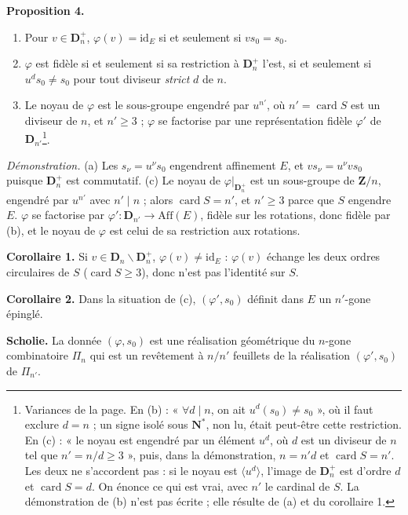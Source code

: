 \documentclass[11pt,a4paper]{article}
\begin{document}
\textbf{Proposition 4.}
\begin{enumerate}
  \item[(a)] Pour $v \in \mathbf{D}_n^{+}$, $\varphi(v) = \mathrm{id}_E$ si et
    seulement si $v s_0 = s_0$.
  \item[(b)] $\varphi$ est fidèle si et seulement si sa restriction à
    $\mathbf{D}_n^{+}$ l'est, si et seulement si $u^d s_0 \neq s_0$ pour tout
    diviseur \emph{strict} $d$ de $n$.
  \item[(c)] Le noyau de $\varphi$ est le sous-groupe engendré par
    $u^{n'}$, où $n' = \operatorname{card} S$ est un diviseur de $n$, et
    $n' \geq 3$ ; $\varphi$ se factorise par une représentation fidèle
    $\varphi'$ de $\mathbf{D}_{n'}$\footnote{Variances de la page. En (b) :
    « $\forall d \mid n$, on ait $u^d(s_0) \neq s_0$ », où il faut exclure
    $d = n$ ; un signe isolé sous $\mathbf{N}^{*}$, non lu, était peut-être
    cette restriction. En (c) : « le noyau est engendré par un élément $u^d$,
    où $d$ est un diviseur de $n$ tel que $n' = n/d \geq 3$ », puis, dans la
    démonstration, $n = n'd$ et $\operatorname{card} S = n'$. Les deux ne
    s'accordent pas : si le noyau est $\langle u^d \rangle$, l'image de
    $\mathbf{D}_n^{+}$ est d'ordre $d$ et $\operatorname{card} S = d$. On
    énonce ce qui est vrai, avec $n'$ le cardinal de $S$. La démonstration
    de (b) n'est pas écrite ; elle résulte de (a) et du corollaire 1.}.
\end{enumerate}
\emph{Démonstration.} (a) Les $s_\nu = u^\nu s_0$ engendrent affinement $E$, et
$v s_\nu = u^\nu v s_0$ puisque $\mathbf{D}_n^{+}$ est commutatif. (c) Le noyau
de $\varphi|_{\mathbf{D}_n^{+}}$ est un sous-groupe de $\mathbf{Z}/n$, engendré
par $u^{n'}$ avec $n' \mid n$ ; alors $\operatorname{card} S = n'$, et $n'
\geq 3$ parce que $S$ engendre $E$. $\varphi$ se factorise par $\varphi' :
\mathbf{D}_{n'} \to \mathrm{Aff}(E)$, fidèle sur les rotations, donc fidèle
par (b), et le noyau de $\varphi$ est celui de sa restriction aux rotations.

\textbf{Corollaire 1.} Si $v \in \mathbf{D}_n \smallsetminus
\mathbf{D}_n^{+}$, $\varphi(v) \neq \mathrm{id}_E$ : $\varphi(v)$ échange les
deux ordres circulaires de $S$ ($\operatorname{card} S \geq 3$), donc n'est
pas l'identité sur $S$.

\textbf{Corollaire 2.} Dans la situation de (c), $(\varphi', s_0)$ définit
dans $E$ un $n'$-gone épinglé.

\textbf{Scholie.} La donnée $(\varphi, s_0)$ est une réalisation géométrique
du $n$-gone combinatoire $\Pi_n$ qui est un revêtement à $n/n'$ feuillets de
la réalisation $(\varphi', s_0)$ de $\Pi_{n'}$.
\end{document}
